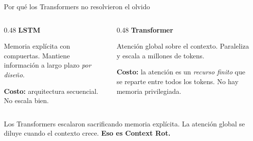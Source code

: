 \documentclass[aspectratio=169, 11pt]{beamer}
\begin{document}
\begin{frame}{Por qu\'e los Transformers no resolvieron el olvido}

\begin{columns}[T]
\begin{column}{0.48\textwidth}
\textbf{LSTM}

\vspace{0.3em}
\footnotesize
Memoria expl\'icita con compuertas. Mantiene informaci\'on a largo plazo \emph{por dise\~no}.

\vspace{0.4em}

\textbf{Costo:} arquitectura secuencial. No escala bien.
\end{column}

\begin{column}{0.48\textwidth}
\textbf{Transformer}

\vspace{0.3em}
\footnotesize
Atenci\'on global sobre el contexto. Paraleliza y escala a millones de tokens.

\vspace{0.4em}

\textbf{Costo:} la atenci\'on es un \emph{recurso finito} que se reparte entre todos los tokens. No hay memoria privilegiada.
\end{column}
\end{columns}

\vspace{1em}

\begin{alertblock}{}
\footnotesize
Los Transformers escalaron sacrificando memoria expl\'icita. La atenci\'on global se diluye cuando el contexto crece. \textbf{Eso es Context Rot.}
\end{alertblock}

\end{frame}

\end{document}

